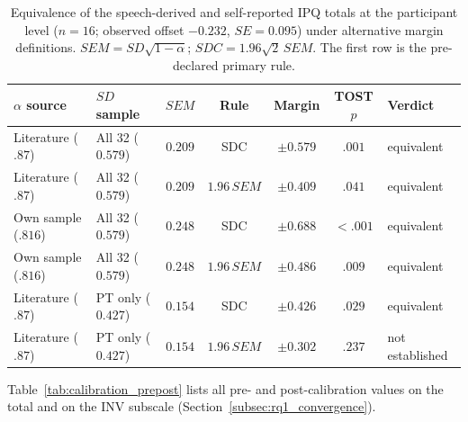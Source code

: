 \begin{table}[htbp]
\centering
\caption{Equivalence of the speech-derived and self-reported IPQ totals at the participant level ($n=16$; observed offset $-0.232$, $SE=0.095$) under alternative margin definitions. $SEM = SD\sqrt{1-\alpha}$; $SDC = 1.96\sqrt{2}\,SEM$. The first row is the pre-declared primary rule.}
\label{tab:equivalence}
\small
\begin{tabular}{llccccl}
\hline
$\alpha$ source & $SD$ sample & $SEM$ & Rule & Margin & TOST $p$ & Verdict \\
\hline
Literature ($.87$)~\cite{schwind2019presence} & All 32 ($0.579$) & $0.209$ & SDC & $\pm0.579$ & $.001$ & equivalent \\
Literature ($.87$) & All 32 ($0.579$) & $0.209$ & $1.96\,SEM$ & $\pm0.409$ & $.041$ & equivalent \\
Own sample ($.816$) & All 32 ($0.579$) & $0.248$ & SDC & $\pm0.688$ & $<.001$ & equivalent \\
Own sample ($.816$) & All 32 ($0.579$) & $0.248$ & $1.96\,SEM$ & $\pm0.486$ & $.009$ & equivalent \\
Literature ($.87$) & PT only ($0.427$) & $0.154$ & SDC & $\pm0.426$ & $.029$ & equivalent \\
Literature ($.87$) & PT only ($0.427$) & $0.154$ & $1.96\,SEM$ & $\pm0.302$ & $.237$ & not established \\
\hline
\end{tabular}
\end{table}

Table~\ref{tab:calibration_prepost} lists all pre- and post-calibration values on the total and on the INV subscale (Section~\ref{subsec:rq1_convergence}).

